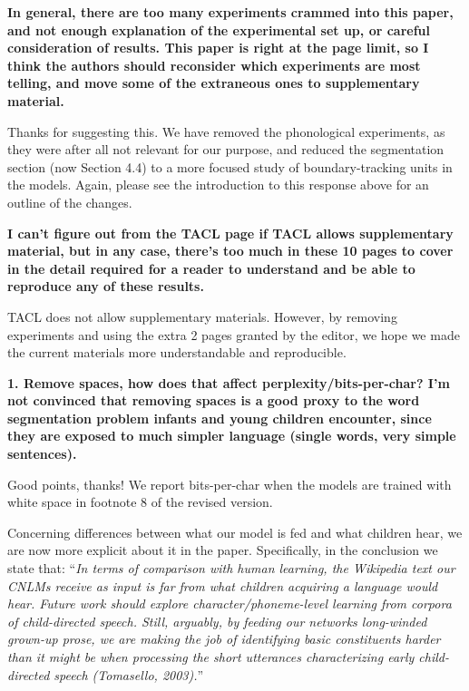 \documentclass{article}
\begin{document}
\textbf{In general, there are too many experiments crammed into this paper, and not enough explanation of the experimental set up, or careful consideration of results.  This paper is right at the page limit, so I think the authors should reconsider which experiments are most telling, and move some of the extraneous ones to supplementary material.}

Thanks for suggesting this. We have removed the phonological experiments, as they were after all not relevant for our purpose, and reduced the segmentation section (now Section 4.4) to a more focused study of boundary-tracking units in the models. Again, please see the introduction to this response above for an outline of the changes.
\newline

\textbf{I can't figure out from the TACL page if TACL allows supplementary material, but in any case, there's too much in these 10 pages to cover in the detail required for a reader to understand and be able to reproduce any of these results.}

TACL does not allow supplementary materials. However, by removing experiments and using the extra 2 pages granted by the editor, we hope we made the current materials more understandable and reproducible.
\newline

\textbf{1. Remove spaces, how does that affect perplexity/bits-per-char? I'm not convinced that removing spaces is a good proxy to the word segmentation problem infants and young children encounter, since they are exposed to much simpler language (single words, very simple sentences).}

Good points, thanks! We report bits-per-char when the models are trained with white space in footnote 8 of the revised version.

Concerning differences between what our model is fed and what children hear, we are now more explicit about it in the paper. Specifically, in the conclusion we state that: ``\textit{In terms of  comparison with human learning, the Wikipedia text our CNLMs receive as input is far from what children acquiring a language would hear. Future work should explore character/phoneme-level learning from corpora of child-directed speech. Still, arguably, by feeding our networks long-winded grown-up prose, we are making the job of identifying basic constituents harder than it might be when processing the short utterances characterizing early child-directed speech (Tomasello, 2003).}''
\end{document}
